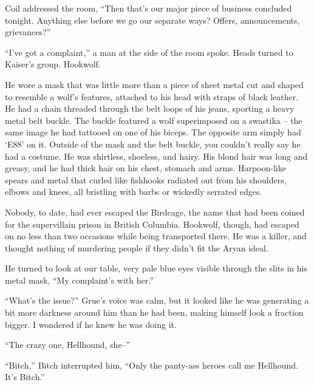 





Coil addressed the room, ``Then that's our major piece of business concluded tonight.  Anything else before we go our separate ways?  Offers, announcements, grievances?''



``I've got a complaint,'' a man at the side of the room spoke.  Heads turned to Kaiser's group.  Hookwolf.



He wore a mask that was little more than a piece of sheet metal cut and shaped to resemble a wolf's features, attached to his head with straps of black leather.  He had a chain threaded through the belt loops of his jeans, sporting a heavy metal belt buckle.  The buckle featured a wolf superimposed on a swastika – the same image he had tattooed on one of his biceps.  The opposite arm simply had `E88' on it.  Outside of the mask and the belt buckle, you couldn't really say he had a costume.  He was shirtless, shoeless, and hairy.  His blond hair was long and greasy, and he had thick hair on his chest, stomach and arms.  Harpoon-like spears and metal that curled like fishhooks radiated out from his shoulders, elbows and knees, all bristling with barbs or wickedly serrated edges.



Nobody, to date, had ever escaped the Birdcage, the name that had been coined for the supervillain prison in British Columbia.  Hookwolf, though, had escaped on no less than two occasions while being transported there.  He was a killer, and thought nothing of murdering people if they didn't fit the Aryan ideal.



He turned to look at our table, very pale blue eyes visible through the slits in his metal mask, ``My complaint's with her.''



``What's the issue?'' Grue's voice was calm, but it looked like he was generating a bit more darkness around him than he had been, making himself look a fraction bigger.  I wondered if he knew he was doing it.



``The crazy one, Hellhound, she--''



``Bitch,'' Bitch interrupted him, ``Only the panty-ass heroes call me Hellhound.  It's Bitch.''




